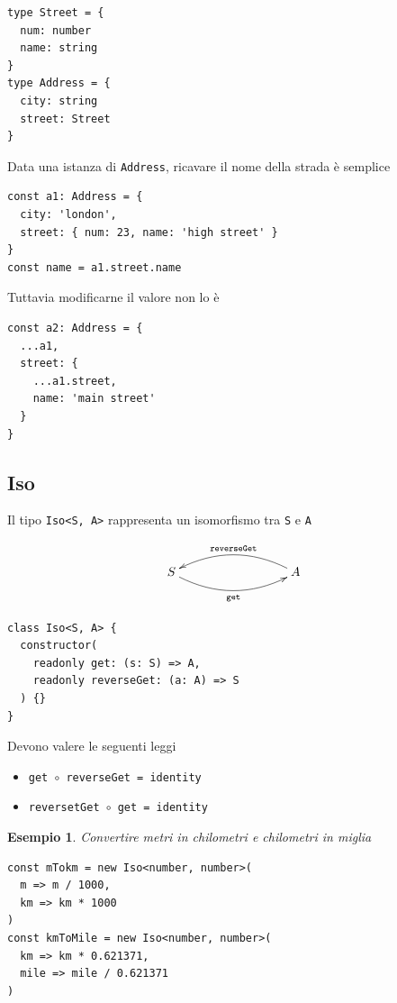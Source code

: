 \documentclass[12pt]{article}
\newtheorem{example}{Esempio}
\begin{document}
\begin{verbatim}
type Street = {
  num: number
  name: string
}
type Address = {
  city: string
  street: Street
}
\end{verbatim}

Data una istanza di \texttt{Address}, ricavare il nome della strada è semplice

\begin{verbatim}
const a1: Address = {
  city: 'london',
  street: { num: 23, name: 'high street' }
}
const name = a1.street.name
\end{verbatim}

Tuttavia modificarne il valore non lo è

\begin{verbatim}
const a2: Address = {
  ...a1,
  street: {
    ...a1.street,
    name: 'main street'
  }
}
\end{verbatim}

\subsection{Iso}

Il tipo \texttt{Iso<S, A>} rappresenta un isomorfismo tra \texttt{S} e \texttt{A}

\[
\xymatrixrowsep{3cm}
\xymatrixcolsep{3cm}
\xymatrix{
  S \ar@/_0.5cm/[r]_{\texttt{get}} & A \ar@/_0.5cm/[l]_{\texttt{reverseGet}}
}
\]

\begin{verbatim}
class Iso<S, A> {
  constructor(
    readonly get: (s: S) => A,
    readonly reverseGet: (a: A) => S
  ) {}
}
\end{verbatim}

Devono valere le seguenti leggi

\begin{itemize}
  \item \texttt{get $\circ$ reverseGet = identity}
  \item \texttt{reversetGet $\circ$ get = identity}
\end{itemize}

\begin{example}

Convertire metri in chilometri e chilometri in miglia

\begin{verbatim}
const mTokm = new Iso<number, number>(
  m => m / 1000,
  km => km * 1000
)
const kmToMile = new Iso<number, number>(
  km => km * 0.621371,
  mile => mile / 0.621371
)
\end{verbatim}
\end{example}
\end{document}
